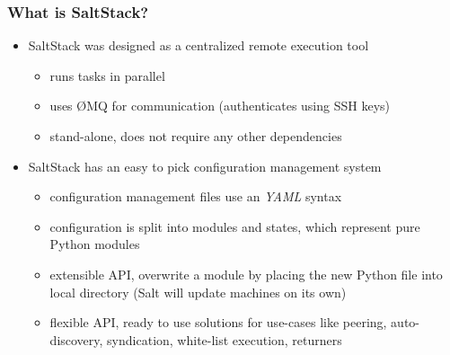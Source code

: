 \documentclass[compress]{beamer}
\begin{document}
\begin{frame}
\frametitle{What is SaltStack?}

\begin{itemize}[<+->]
  \item SaltStack was designed as a centralized remote execution tool
    \begin{itemize}[<+->]
      \item runs tasks in parallel
      \item uses ØMQ for communication (authenticates using SSH keys)
      \item stand-alone, does not require any other dependencies
    \end{itemize}
  \item SaltStack has an easy to pick configuration management system
    \begin{itemize}[<+->]
      \item configuration management files use an \emph{YAML} syntax
      \item configuration is split into modules and states, which represent pure Python modules
      \item extensible API, overwrite a module by placing the new Python file into local directory (Salt will update machines on its own)
      \item flexible API, ready to use solutions for use-cases like peering, auto-discovery, syndication, white-list execution, returners
    \end{itemize}
\end{itemize}
\end{frame}
\end{document}
